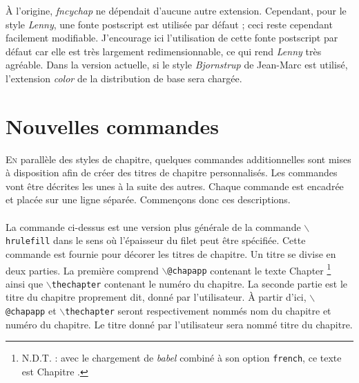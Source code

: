 \documentclass{report}
\newcommand{\sk}{\vspace{0.2 cm}}
\newcommand{\A}[1]{{$\backslash${\tt #1}}}
\newcommand{\nsp}{\mbox{\hspace{-1 cm}}}
\begin{document}
    À l'origine, \textsl{fncychap} ne dépendait d'aucune autre extension. 
    Cependant, pour le style \emph{Lenny}, une fonte postscript est utilisée
    par défaut ; ceci reste cependant facilement modifiable. J'encourage ici 
    l'utilisation de cette fonte postscript par défaut car elle est 
    très largement redimensionnable, ce qui rend \emph{Lenny} 
    très agréable. Dans la version actuelle, si le style \textsl{Bjornstrup}
    de Jean-Marc est utilisé, l'extension \textsl{color} de la distribution de
    base sera chargée. 
    
  \chapter{Nouvelles commandes}
    \lettrine[findent=0.2em,nindent=0em,realheight=true]{E}{n} parallèle des 
    styles de chapitre, quelques commandes additionnelles sont mises à 
    disposition afin de créer des titres de chapitre personnalisés.
    Les commandes vont être décrites les unes à la suite des autres. Chaque
    commande est encadrée et placée sur une ligne séparée. Commençons donc 
    ces descriptions.\sk\\
    \nsp\fbox{\A{mghrulefill}\{{\em épaisseur}\}}\sk\\
    La commande ci-dessus est une version plus générale de la commande
    \A{hrulefill} dans le sens où l'épaisseur du filet peut être spécifiée.
    Cette commande est fournie pour décorer les titres de chapitre. Un
    titre se divise en deux parties. La première comprend \A{@chapapp} 
    contenant le texte \og Chapter \fg{}\footnote{N.D.T. : avec le chargement
    de \textsl{babel} combiné à son option \texttt{french}, ce texte est 
    \og Chapitre \fg{}.} ainsi que \A{thechapter} contenant le numéro du
    chapitre. La seconde partie est le titre du chapitre proprement dit, donné
    par l'utilisateur. À partir d'ici, \A{@chapapp} et \A{thechapter} seront
    respectivement nommés nom du chapitre et numéro du chapitre. Le titre
    donné par l'utilisateur sera nommé titre du chapitre.
\end{document}
